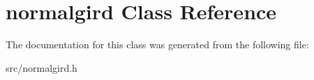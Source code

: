 \hypertarget{classnormalgird}{\section{normalgird Class Reference}
\label{classnormalgird}
}


The documentation for this class was generated from the following file\-:\begin{DoxyCompactItemize}
\item 
src/normalgird.\-h\end{DoxyCompactItemize}
